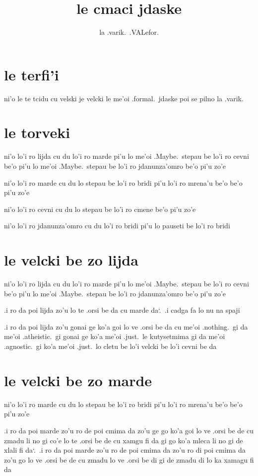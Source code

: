 \documentclass{report}
\title{le cmaci jdaske}
\author{la .varik.\ .VALefor.}
\newcommand\sds{\spacefactor\sfcode`.\ \space}
\newcommand\lijdyvelcki{lo'i ro lijda cu du lo'i ro marde pi'u lo me'oi .Maybe.\ stepau be lo'i ro cevni be'o pi'u lo me'oi .Maybe.\ stepau be lo'i ro jdanunza'omro be'o pi'u zo'e}
\newcommand\mardyvelcki{lo'i ro marde cu du lo stepau be lo'i ro bridi pi'u lo'i ro mrena'u be'o be'o pi'u zo'e}
\newcommand\cevnyvelcki{lo'i ro cevni cu du lo stepau be lo'i ro cmene be'o pi'u zo'e}
\newcommand\jdanunzahomrovelcki{lo'i ro jdanunza'omro cu du lo'i ro bridi pi'u lo pauseti be lo'i ro bridi}
\begin{document}
\maketitle{}
\tableofcontents{}
\chapter{le terfi'i}
ni'o le te tcidu cu velski je velcki le me'oi .formal.\ jdaske poi se pilno la .varik.

\chapter{le torveki}
ni'o \lijdyvelcki

ni'o \mardyvelcki

ni'o \cevnyvelcki

ni'o \jdanunzahomrovelcki

\chapter{le velcki be zo lijda}
ni'o \lijdyvelcki

.i ro da poi lijda zo'u lo te .orsi be da cu marde da\sds  .i cadga fa lo nu na spaji

.i ro da poi lijda zo'u gonai ge ko'a goi lo ve .orsi be da cu me'oi .nothing.\ gi da me'oi .atheistic.\ gi gonai ge ko'a me'oi .just.\ le kutysetmima gi da me'oi .agnostic.\ gi ko'a me'oi .just.\ lo cletu be lo'i velcki be lo'i cevni be da

\chapter{le velcki be zo marde}
ni'o \mardyvelcki

.i ro da poi marde zo'u ro de poi cmima da zo'u ge go ko'a goi lo ve .orsi be de cu zmadu li no gi co'e lo te .orsi be de cu xamgu fi da gi go ko'a mleca li no gi de xlali fi da\sds .i ro da poi marde zo'u ro de poi cmima da zo'u ro di poi cmima da zo'u go lo ve .orsi be de cu zmadu lo ve .orsi be di gi de zmadu di lo ka xamagu fi da
\end{document}
